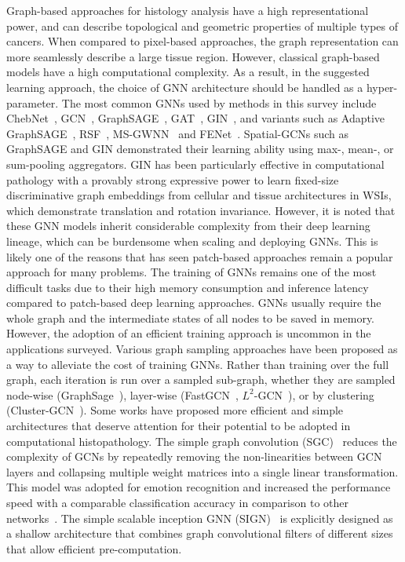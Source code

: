 Graph-based approaches for histology analysis have a high representational power, and can describe topological and geometric properties of multiple types of cancers. When compared to pixel-based approaches, the graph representation can more seamlessly describe a large tissue region. However, classical graph-based models have a high computational complexity. As a result, in the suggested learning approach, the choice of GNN architecture should be handled as a hyper-parameter.
The most common GNNs used by methods in this survey include ChebNet~, GCN~, GraphSAGE~, GAT~, GIN~, and variants such as Adaptive GraphSAGE~, RSF~, MS-GWNN~ and FENet~.
Spatial-GCNs such as GraphSAGE and GIN demonstrated their learning ability using max-, mean-, or sum-pooling aggregators. GIN has been particularly effective in computational pathology with a provably strong expressive power to learn fixed-size discriminative graph embeddings from cellular and tissue architectures in WSIs, which demonstrate translation and rotation invariance. 
However, it is noted that these GNN models inherit considerable complexity from their deep learning lineage, which can be burdensome when scaling and deploying GNNs. This is likely one of the reasons that has seen patch-based approaches remain a popular approach for many problems.
The training of GNNs remains one of the most difficult tasks due to their high memory consumption and inference latency compared to patch-based deep learning approaches.
GNNs usually require the whole graph and the intermediate states of all nodes to be saved in memory. However, the adoption of an efficient training approach is uncommon in the applications surveyed.
Various graph sampling approaches have been proposed as a way to alleviate the cost of training GNNs. Rather than training over the full graph, each iteration is run over a sampled sub-graph, whether they are sampled node-wise (GraphSage~), layer-wise (FastGCN~, $L^2$-GCN~), or by clustering (Cluster-GCN~).
Some works have proposed more efficient and simple architectures that deserve attention for their potential to be adopted in computational histopathology.
The simple graph convolution (SGC)~ reduces the complexity of GCNs by repeatedly removing the non-linearities between GCN layers and collapsing multiple weight matrices into a single linear transformation. This model was adopted for emotion recognition and increased the performance speed with a comparable classification accuracy in comparison to other networks~.
The simple scalable inception GNN (SIGN)~ is explicitly designed as a shallow architecture that combines graph convolutional filters of different sizes that allow efficient pre-computation.
